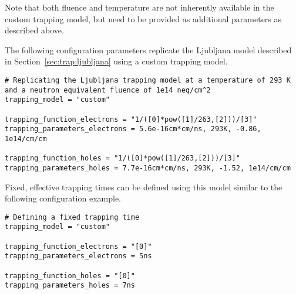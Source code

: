 \begin{warning}
Note that both fluence and temperature are not inherently available in the custom trapping model, but need to be provided as additional parameters as described above.
\end{warning}

The following configuration parameters replicate the Ljubljana model described in Section~\ref{sec:trap:ljubljana} using a custom trapping model.
\begin{verbatim}
# Replicating the Ljubljana trapping model at a temperature of 293 K and a neutron equivalent fluence of 1e14 neq/cm^2
trapping_model = "custom"

trapping_function_electrons = "1/([0]*pow([1]/263,[2]))/[3]"
trapping_parameters_electrons = 5.6e-16cm*cm/ns, 293K, -0.86, 1e14/cm/cm

trapping_function_holes = "1/([0]*pow([1]/263,[2]))/[3]"
trapping_parameters_holes = 7.7e-16cm*cm/ns, 293K, -1.52, 1e14/cm/cm
\end{verbatim}

Fixed, effective trapping times can be defined using this model similar to the following configuration example.
\begin{verbatim}
# Defining a fixed trapping time
trapping_model = "custom"

trapping_function_electrons = "[0]"
trapping_parameters_electrons = 5ns

trapping_function_holes = "[0]"
trapping_parameters_holes = 7ns
\end{verbatim}
